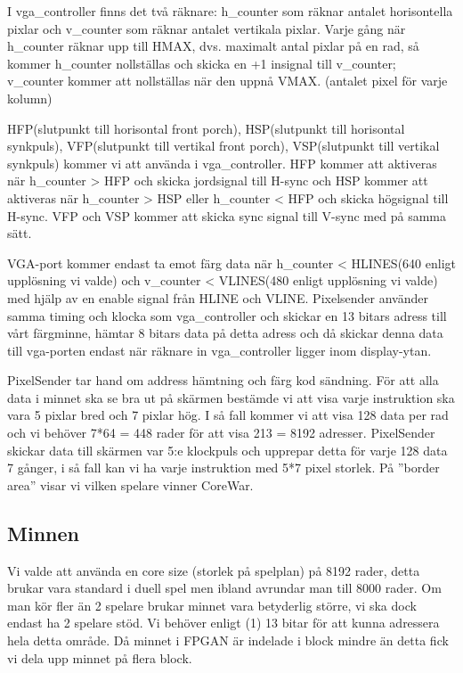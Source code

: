 \documentclass[11pt]{article}
\begin{document}
I vga\_controller finns det två räknare: h\_counter som räknar antalet horisontella pixlar och v\_counter som räknar antalet vertikala pixlar. Varje gång när h\_counter räknar upp till HMAX, dvs. maximalt antal pixlar på en rad, så kommer h\_counter nollställas och skicka en +1 insignal till v\_counter; v\_counter kommer att nollställas när den uppnå VMAX. (antalet pixel för varje kolumn)

HFP(slutpunkt till horisontal front porch), HSP(slutpunkt till horisontal synkpuls), VFP(slutpunkt till vertikal front porch), VSP(slutpunkt till vertikal synkpuls) kommer vi att använda i vga\_controller. HFP kommer att aktiveras när h\_counter > HFP och skicka jordsignal till H-sync och HSP kommer att aktiveras när h\_counter > HSP eller h\_counter < HFP och skicka högsignal till H-sync. VFP och VSP kommer att skicka sync signal till V-sync med på samma sätt.


VGA-port kommer endast ta emot färg data när h\_counter < HLINES(640 enligt upplösning vi valde) och v\_counter < VLINES(480 enligt upplösning vi valde) med hjälp av en enable signal från HLINE och VLINE.
Pixelsender använder samma timing och klocka som vga\_controller och skickar en 13 bitars adress till vårt färgminne, hämtar 8 bitars data på detta adress och då skickar denna data till vga-porten endast när räknare in vga\_controller ligger inom display-ytan.

PixelSender tar hand om address hämtning och färg kod sändning. För att alla data i minnet ska se bra ut på skärmen bestämde vi att visa varje instruktion ska vara 5 pixlar bred och 7 pixlar hög. I så fall kommer vi att visa 128 data per rad och vi behöver 7*64 = 448 rader för att visa 213 = 8192 adresser. PixelSender skickar data till skärmen var 5:e klockpuls och upprepar detta för varje 128 data 7 gånger, i så fall kan vi ha varje instruktion med 5*7 pixel storlek. På ”border area” visar vi vilken spelare vinner CoreWar.

\subsection{Minnen}

Vi valde att använda en core size (storlek på spelplan) på 8192 rader, detta brukar vara standard i duell spel men ibland avrundar man till 8000 rader. Om man kör fler än 2 spelare brukar minnet vara betyderlig större, vi ska dock endast ha 2 spelare stöd. Vi behöver enligt (1) 13 bitar för att kunna adressera hela detta område. Då minnet i FPGAN är indelade i block mindre än detta fick vi dela upp minnet på flera block.
\end{document}
